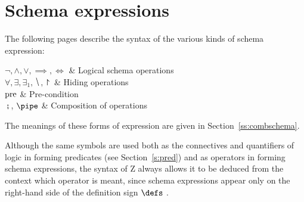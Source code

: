 \section{Schema expressions}\label{s:schemaexp}

The following pages describe the syntax of the various kinds of
schema expression:
\begin{menu}
        $\neg, \land, \lor, \implies, \iff$
		& Logical schema operations  \\
        $\forall, \exists, \exists_1, \hide, \project$
		& Hiding operations  \\
        $\rm pre$
		& Pre-condition  \\
	$\semi$, $\pipe$
		& Composition of operations 
\end{menu}
The meanings of these forms of expression are given in
Section~\ref{ss:combschema}.

Although the same symbols are used both as the connectives and
quantifiers of logic in forming predicates (see
Section~\ref{s:pred}) and as operators in forming schema
expressions, the syntax of Z always allows it to be deduced from the
context which operator is meant, since schema expressions appear
only on the right-hand side of the definition sign $\defs~$.

